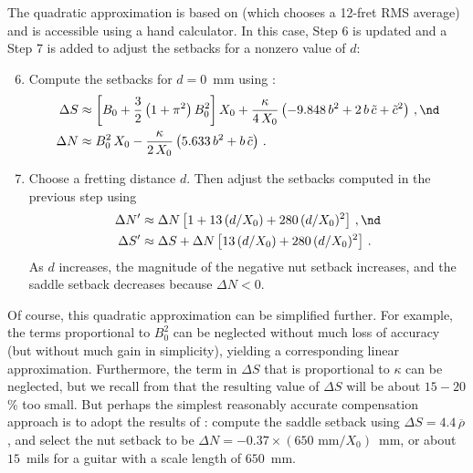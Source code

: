 The quadratic approximation is based on  (which chooses a 12-fret RMS average) and  is accessible using a hand calculator. In this case, Step 6 is updated and a Step 7 is added to adjust the setbacks for a nonzero value of $d$:
\begin{enumerate}
    \setcounter{enumi}{5}
    \item Compute the setbacks for $d = 0$~mm using :
    \begin{align*}
        \Delta S &\approx \left[ B_0 + \frac{3}{2} \left(1 + \pi^2\right) B_0^2 \right] X_0 + \frac{\kappa}{4\, X_0} \left( -9.848\, b^2 + 2\, b\, \tilde{c} + \tilde{c}^2 \right)\, , \nd \\
        \Delta N &\approx B_0^2\, X_0 - \frac{\kappa}{2\, X_0} \left( 5.633\, b^2 + b\, \tilde{c} \right)\, .
    \end{align*}
    \item Choose a fretting distance $d$. Then adjust the setbacks computed in the previous step using
    \begin{align*}
        \Delta N^\prime &\approx \Delta N \left[ 1 + 13\, (d/X_0) + 280\, (d/X_0)^2 \right]\, , \nd \\
        \Delta S^\prime &\approx \Delta S + \Delta N \left[13\, (d/X_0) + 280\, (d/X_0)^2 \right]\, .
    \end{align*}
    As $d$ increases, the magnitude of the negative nut setback increases, and the saddle setback decreases because $\Delta N < 0$. 
\end{enumerate}
Of course, this quadratic approximation can be simplified further. For example, the terms proportional to $B_0^2$ can be neglected without much loss of accuracy (but without much gain in simplicity), yielding a corresponding linear approximation. Furthermore, the term in $\Delta S$ that is proportional to $\kappa$ can be neglected, but we recall from  that the resulting value of $\Delta S$ will be about  $15 - 20$\% too small. But perhaps the simplest reasonably accurate compensation approach is to adopt the results of : compute the saddle setback using $\Delta S = 4.4\, \overline{\rho}$, and select the nut setback to be $\Delta N = -0.37 \times (650 \textrm{ mm} / X_0)$~mm, or about $15$~mils for a guitar with a scale length of $650$~mm.

